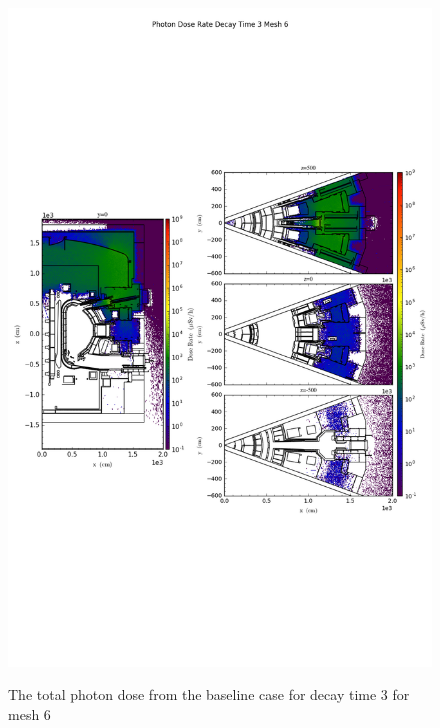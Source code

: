 \begin{figure}[ht!]
\centering
\includegraphics[trim={0cm 9cm 0cm 10cm},clip,scale=0.75]{../plots/final_model_nob4c/Photon_Dose_Rate_Decay_Time_3_Mesh_6.png}
\label{fig:photons_dc3_no4bc_m6_flux}
\caption{The total photon dose from the baseline case for decay time 3 for mesh 6}
\end{figure}
